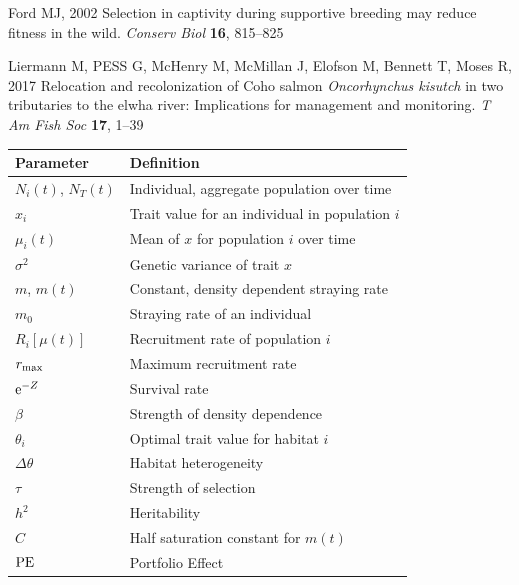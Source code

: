 \documentclass{revtex4}
\begin{document}
\begin{thebibliography}{10}
Ford MJ, 2002 {Selection in captivity during supportive breeding may reduce
  fitness in the wild}.
\newblock \emph{Conserv Biol} \textbf{16}, 815--825

Liermann M, PESS G, McHenry M, McMillan J, Elofson M, Bennett T, Moses R, 2017
  {Relocation and recolonization of Coho salmon \emph{Oncorhynchus kisutch} in
  two tributaries to the elwha river: Implications for management and
  monitoring}.
\newblock \emph{T Am Fish Soc} \textbf{17}, 1--39

\end{thebibliography}



\clearpage

\begin{center}
\begin{tabular}{ l|l }
\hline
Parameter & Definition \\
\hline
$N_i(t)$, $N_T(t)$ & Individual, aggregate population over time\\
$x_i$ & Trait value for an individual in population $i$\\
$\mu_i(t)$ & Mean of $x$ for population $i$ over time\\
$\sigma^2$ & Genetic variance of trait $x$\\
$m$, $m(t)$ & Constant, density dependent straying rate\\
$m_0$ & Straying rate of an individual\\
$R_i[\mu(t)]$ & Recruitment rate of population $i$\\
$r_{\rm max}$ & Maximum recruitment rate\\
${\rm e}^{-Z}$ & Survival rate\\
$\beta$ & Strength of density dependence\\
$\theta_i$ & Optimal trait value for habitat $i$\\
$\Delta\theta$ & Habitat heterogeneity\\
$\tau$ & Strength of selection\\
$h^2$ & Heritability\\
$C$ & Half saturation constant for $m(t)$\\
${\rm PE}$ & Portfolio Effect\\
\hline
\end{tabular}
\end{center}
\end{document}
